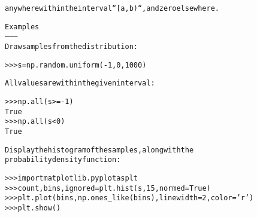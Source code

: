 \begin{boxedminipage}{\funcwidth}
\begin{alltt}
anywhere within the interval ``[a, b)``, and zero elsewhere.

Examples
--------
Draw samples from the distribution:

{\textgreater}{\textgreater}{\textgreater} s = np.random.uniform(-1,0,1000)

All values are within the given interval:

{\textgreater}{\textgreater}{\textgreater} np.all(s {\textgreater}= -1)
True
{\textgreater}{\textgreater}{\textgreater} np.all(s {\textless} 0)
True

Display the histogram of the samples, along with the
probability density function:

{\textgreater}{\textgreater}{\textgreater} import matplotlib.pyplot as plt
{\textgreater}{\textgreater}{\textgreater} count, bins, ignored = plt.hist(s, 15, normed=True)
{\textgreater}{\textgreater}{\textgreater} plt.plot(bins, np.ones\_like(bins), linewidth=2, color='r')
{\textgreater}{\textgreater}{\textgreater} plt.show()
\end{alltt}

\setlength{\parskip}{1ex}
    \end{boxedminipage}

    \label{QSTK:qstklearn:mldiagnostics:vonmises}

    \vspace{0.5ex}

